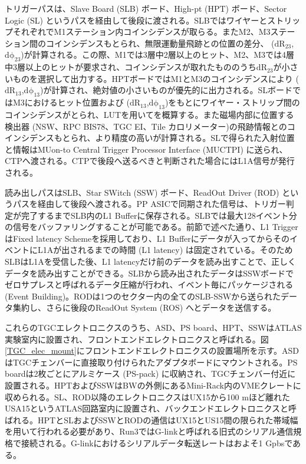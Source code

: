 トリガーパスは、Slave Board  (SLB) ボード、High-pt  (HPT) ボード、Sector Logic  (SL) というパスを経由して後段に渡される。SLBではワイヤーとストリップそれぞれでM1ステーション内コインシデンスが取らる。またM2、M3ステーション間のコインシデンスもとられ、無限運動量飛跡との位置の差分、 ($\mathrm{dR_{23}}$,$\mathrm{d\phi_{23}}$)が計算される。この際、M1では3層中2層以上のヒット、M2、M3では4層中3層以上のヒットが要求され、コインシデンスが取れたもののうち$\mathrm{dR_{23}}$が小さいものを選択して出力する。HPTボードではM1とM3のコインシデンスにより ($\mathrm{dR_{13}}$,$\mathrm{d\phi_{13}}$)が計算され、絶対値の小さいものが優先的に出力される。SLボードではM3におけるヒット位置および ($\mathrm{dR_{13}}$,$\mathrm{d\phi_{13}}$)をもとにワイヤー・ストリップ間のコインシデンスがとられ、LUTを用いて\pt を概算する。また磁場内部に位置する検出器 (NSW、RPC BIS78、TGC EI、Tile カロリメーター)の飛跡情報とのコインシデンスもとられ、より精度の高い\pt が計算される。SLで得られた入射位置と\pt 情報はMUon-to Central Trigger Processor Interface  (MUCTPI) に送られ、CTPへ渡される。CTPで後段へ送るべきと判断された場合にはL1A信号が発行される。

読み出しパスはSLB、Star SWitch  (SSW) ボード、ReadOut Driver  (ROD) というパスを経由して後段へ渡される。PP ASICで同期された信号は、トリガー判定が完了するまでSLB内のL1 Bufferに保存される。SLBでは最大128イベント分の信号をバッファリングすることが可能である。前節で述べた通り、L1 TriggerはFixed latency Schemeを採用しており、L1 Bufferにデータが入ってからそのイベントにL1Aが出されるまでの時間  (L1 latency) は固定されている。そのためSLBはL1Aを受信した後、L1 latencyだけ前のデータを読み出すことで、正しくデータを読み出すことができる。SLBから読み出されたデータはSSWボードでゼロサプレスと呼ばれるデータ圧縮が行われ、イベント毎にパッケージされる  (Event Building)。RODは1つのセクター内の全てのSLB-SSWから送られたデータ集約し、さらに後段のReadOut System  (ROS) へとデータを送信する。

これらのTGCエレクトロニクスのうち、ASD、PS board、HPT、SSWはATLAS実験室内に設置され、フロントエンドエレクトロニクスと呼ばれる。図\ref{TGC_elec_mount}にフロントエンドエレクトロニクスの設置場所を示す。ASDはTGCチェンバーに直接取り付けられたアダプタボードにマウントされる。PS boardは2枚ごとにアルミケース  (PS-pack) に収納され、TGCチェンバー付近に設置される。HPTおよびSSWはBWの外側にあるMini-Rack内のVMEクレートに収められる。SL、ROD以降のエレクトロニクスはUX15から100 mほど離れたUSA15というATLAS回路室内に設置され、バックエンドエレクトロニクスと呼ばれる。HPTとSLおよびSSWとRODの通信はUX15とUS15間の限られた帯域幅を用いて行われる必要があり、Run3ではG-linkと呼ばれる旧式のシリアル通信規格で接続される。G-linkにおけるシリアルデータ転送レートはおよそ1 Gpbsである。

